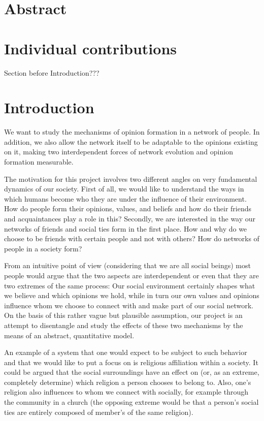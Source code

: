 \documentclass[11pt]{article}
\begin{document}
\section{Abstract}

\section{Individual contributions}

Section before Introduction???

\section{Introduction}

We want to study the mechanisms of opinion formation in a network of people. In addition, we also allow the network itself to be adaptable to the opinions existing on it, making two interdependent forces of network evolution and opinion formation measurable.

The motivation for this project involves two different angles on very fundamental dynamics of our society. First of all, we would like to understand the ways in which humans become who they are under the influence of their environment. How do people form their opinions, values, and beliefs and how do their friends and acquaintances play a role in this? Secondly, we are interested in the way our networks of friends and social ties form in the first place. How and why do we choose to be friends with certain people and not with others? How do networks of people in a society form? 

From an intuitive point of view (considering that we are all social beings) most people would argue that the two aspects are interdependent or even that they are two extremes of the same process: Our social environment certainly shapes what we believe and which opinions we hold, while in turn our own values and opinions influence whom we choose to connect with and make part of our social network. On the basis of this rather vague but plausible assumption, our project is an attempt to disentangle and study the effects of these two mechanisms by the means of an abstract, quantitative model. 

An example of a system that one would expect to be subject to such behavior and that we would like to put a focus on is religious affiliation within a society. It could be argued that the social surroundings have an effect on (or, as an extreme, completely determine) which religion a person chooses to belong to. Also, one's religion also influences to whom we connect with socially, for example through the community in a church (the opposing extreme would be that a person's social ties are entirely composed of member's of the same religion). 
\end{document}
